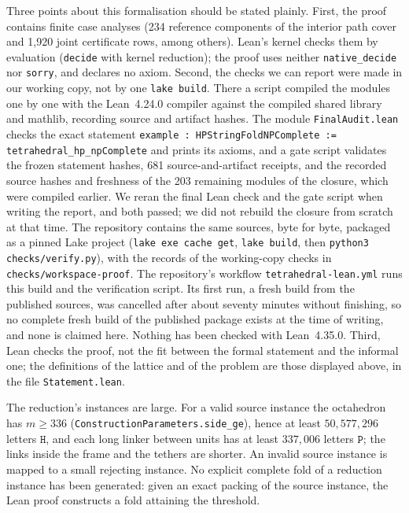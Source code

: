 \documentclass[11pt,letterpaper]{article}
\theoremstyle{definition}
\theoremstyle{remark}
\newcommand{\Hh}{\mathtt{H}}
\newcommand{\Pp}{\mathtt{P}}
\newcommand{\lean}[1]{\texttt{#1}}
\begin{document}
Three points about this formalisation should be stated plainly. First, the proof contains finite
case analyses (234 reference components of the interior path cover and 1{,}920 joint certificate
rows, among others). Lean's kernel checks them by evaluation (\lean{decide} with kernel
reduction); the proof uses neither \lean{native\_decide} nor \lean{sorry}, and declares no axiom.
Second, the checks we can report were made in our working copy, not by one \lean{lake build}.
There a script compiled the modules one by one with the Lean~4.24.0 compiler against the compiled
shared library and mathlib, recording source and artifact hashes. The module \lean{FinalAudit.lean}
checks the exact statement \lean{example : HPStringFoldNPComplete := tetrahedral\_hp\_npComplete}
and prints its axioms, and a gate script validates the frozen statement hashes, 681
source-and-artifact receipts, and the recorded source hashes and freshness of the 203 remaining
modules of the closure, which were compiled earlier. We reran the final Lean check and the gate
script when writing the report, and both passed; we did not rebuild the closure from scratch at
that time. The repository contains the same sources, byte for byte, packaged as a pinned Lake
project (\lean{lake exe cache get}, \lean{lake build}, then \lean{python3 checks/verify.py}), with
the records of the working-copy checks in \lean{checks/workspace-proof}. The repository's workflow
\lean{tetrahedral-lean.yml} runs this build and the verification script. Its first run, a fresh
build from the published sources, was cancelled after about seventy minutes without finishing, so
no complete fresh build of the published package exists at the time of writing, and none is
claimed here. Nothing has been checked with Lean~4.35.0. Third, Lean checks the proof, not the fit between the formal statement
and the informal one; the definitions of the lattice and of the problem are those displayed above,
in the file \lean{Statement.lean}.

The reduction's instances are large. For a valid source instance the octahedron has $m\ge336$
(\lean{ConstructionParameters.side\_ge}), hence at least $50{,}577{,}296$ letters $\Hh$, and each
long linker between units has at least $337{,}006$ letters $\Pp$; the links inside the frame and
the tethers are shorter. An invalid source instance is mapped to a small rejecting instance. No
explicit complete fold of a reduction instance has been generated: given an exact packing of the
source instance, the Lean proof constructs a fold attaining the threshold.
\end{document}
